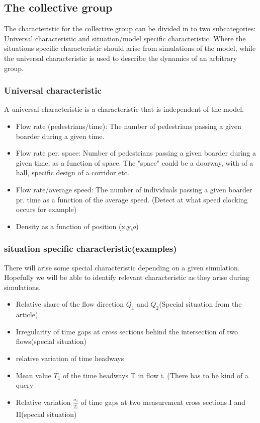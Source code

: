\subsection{The collective group}
The characteristic for the collective group can be divided in to two subcategories: Universal characteristic and situation/model specific characteristic. Where the situations specific characteristic should arise from simulations of the model, while the universal characteristic is used to describe the dynamics of an arbitrary group. 

\subsubsection{Universal characteristic}
A universal characteristic is a characteristic that is independent of the model.
\begin{itemize}
\item Flow rate (pedestrians/time): The number of pedestrians passing a given boarder during a given time.
\item Flow rate per. space: Number of pedestrians passing a given boarder during a given time, as a function of space. The "space" could be a doorway, with of a hall, specific design of a corridor etc.
\item Flow rate/average speed: The number of individuals passing a given boarder pr. time as a function of the average speed. (Detect at what speed clocking occurs for example)
\item Density as a function of position (x,y,$\rho$)
\end{itemize}


\subsubsection{situation specific characteristic(examples)}
There will arise some special characteristic depending on a given simulation. Hopefully we will be able to identify relevant characteristic as they arise during simulations.

\begin{itemize}
\item Relative share of the flow direction $Q_1$ and $Q_2$(Special situation from the article).
\item Irregularity of time gaps at cross sections behind the intersection of two flows(special situation)
\item relative variation of time headways
\item Mean value $\bar{T_1}$ of the time headways T in flow i. (There has to be kind of a query 
\item Relative variation $\frac{\sigma_i}{\bar{T_i}}$ of time gaps at two measurement cross sections I and II(special situation)
\end{itemize}

